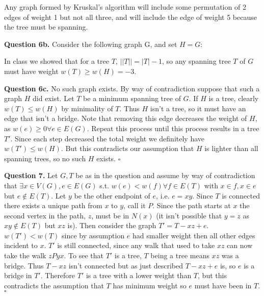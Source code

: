 \documentclass[letterpaper, reqno,11pt]{article}
\begin{document}
Any graph formed by Kruskal's algorithm will include some permutation of 2 edges of weight 1 but not all three, and will include the edge of weight 5 because the tree must be spanning. 

{\medskip\noindent\bf Question 6b.} Consider the following graph G, and set $H=G$: 

\begin{center}
\end{center}

In class we showed that for a tree $T$, $| |T| |=|T|-1$, so any spanning tree $T$ of $G$ must have weight $w(T)\geq w(H)=-3$. 

{\medskip\noindent\bf Question 6c.} No such graph exists. By way of contradiction suppose that such a graph $H$ did exist. Let $T$ be a minimum spanning tree of $G$. If $H$ is a tree, clearly $w(T)\leq w(H)$ by minimality of $T$. Thus $H$ isn't a tree, so it must have an edge that isn't a bridge. Note that removing this edge decreases the weight of $H$, as $w(e)\geq 0\forall e\in E(G)$. Repeat this process until this process results in a tree $T'$. Since each step decreased the total weight we definitely have $w(T')\leq w(H)$. But this contradicts our assumption that $H$ is lighter than all spanning trees, so no such $H$ exists. $\square$

{\medskip\noindent\bf Question 7.} Let $G, T$ be as in the question and assume by way of contradiction that $\exists x\in V(G), e\in E(G)$ s.t. $w(e)<w(f)\forall f\in E(T)$ with $x\in f, x\in e$ but $e \not\in E(T)$. Let $y$ be the other endpoint of $e$, i.e. $e=xy$. Since $T$ is connected there exists a unique path from $x$ to $y$, call it $P$. Since the path starts at $x$ the second vertex in the path, $z$, must be in $N(x)$ (it isn't possible that $y=z$ as $xy\not\in E(T)$ but $xz$ is). Then consider the graph $T'=T-xz+e$. $w(T')< w(T)$ since by assumption $e$ had smaller weight then all other edges incident to $x$. $T'$ is still connected, since any walk that used to take $xz$ can now take the walk $zPyx$. To see that $T'$ is a tree, $T$ being a tree means $xz$ was a bridge. Thus $T-xz$ isn't connected but as just described $T-xz+e$ is, so $e$ is a bridge in $T'$. Therefore $T'$ is a tree with a lower weight than $T$, but this contradicts the assumption that $T$ has minimum weight so $e$ must have been in $T$. $\square$
\end{document}

